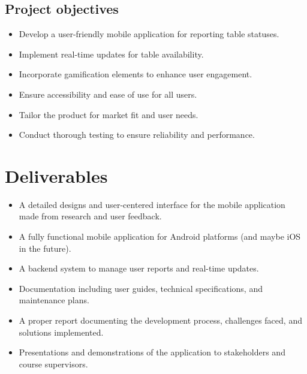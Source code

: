 \documentclass[12pt]{article}
\begin{document}
\subsection*{Project objectives}
\begin{itemize}
    \item Develop a user-friendly mobile application for reporting table statuses.
    \item Implement real-time updates for table availability.
    \item Incorporate gamification elements to enhance user engagement.
    \item Ensure accessibility and ease of use for all users.
    \item Tailor the product for market fit and user needs.
    \item Conduct thorough testing to ensure reliability and performance.
\end{itemize}
\section{Deliverables}
\begin{itemize}
    \item A detailed designs and user-centered interface for the mobile application made from research and user feedback.
    \item A fully functional mobile application for Android platforms (and maybe iOS in the future).
    \item A backend system to manage user reports and real-time updates.
    \item Documentation including user guides, technical specifications, and maintenance plans.
    \item A proper report documenting the development process, challenges faced, and solutions implemented.
    \item Presentations and demonstrations of the application to stakeholders and course supervisors.
\end{itemize}
\end{document}
